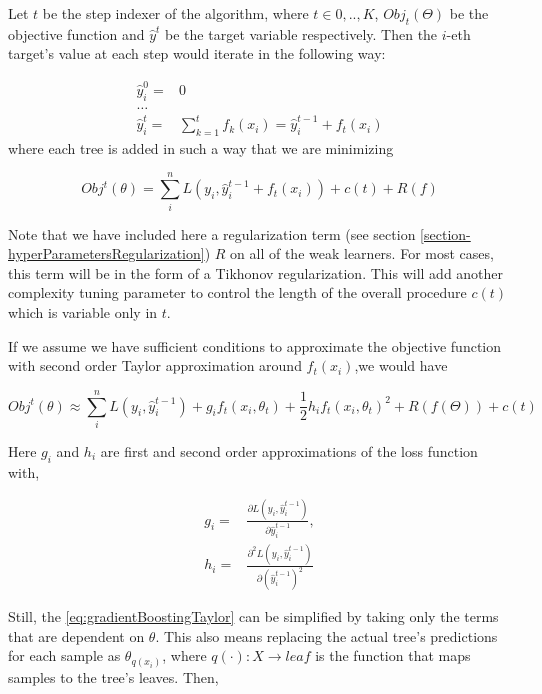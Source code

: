 \begin{appendices}
Let $t$ be the step indexer of the algorithm, where $t \in {0,..,K}$, $Obj_t(\Theta)$ be the objective function and $\hat{y}^t$ be the target variable respectively. 
Then the $i$-eth target's value at each step would iterate in the following way:

\begin{equation}\label{eq:gb-targetSteps}
\begin{split}
\hat{y}_i^0 = & 0 \\
\ldots \\
\hat{y}_i^t = &\sum_{k=1}^{t} f_k(x_i) = \hat{y}^{t-1}_i + f_t(x_i)
\end{split}
\end{equation}
where each tree is added in such a way that we are minimizing

\begin{equation}
Obj^t(\theta) = \sum_i^n L(y_i, \hat{y}^{t-1}_i + f_t(x_i) ) + c(t) + R(f)
\end{equation}


Note that we have included here a regularization term (see section \cref{section-hyperParametersRegularization}) $R$ on all of the weak learners. 
For most cases, this term will be in the form of a Tikhonov regularization. 
This will add another complexity tuning parameter to control the length of the overall procedure $c(t)$ which is variable only in $t$.

If we assume we have sufficient conditions to approximate the objective function with second order Taylor approximation around $f_t(x_i)$,we would have

\begin{equation}\label{eq:gradientBoostingTaylor}
Obj^t(\theta) \approx \sum_i^n {L(y_i, \hat{y}^{t-1}_i) + g_i f_t(x_i,\theta_t) + \frac{1}{2} h_i {f_t(x_i,\theta_t)}^2 } + R(f(\Theta)) + c(t)
\end{equation}

Here $g_i$ and $h_i$ are first and second order approximations of the loss function with,

\begin{equation}
\begin{split}
g_i = & \frac{\partial L(y_i, \hat{y}^{t-1}_i)}{\partial \hat{y}^{t-1}_i},  \\
h_i = & \frac{\partial^2 L(y_i, \hat{y}^{t-1}_i)}{\partial {(\hat{y}^{t-1}_i)}^2 }
\end{split}
\end{equation}

Still, the \cref{eq:gradientBoostingTaylor} can be simplified by taking only the terms that are dependent on $\theta$. 
This also means replacing the actual tree's predictions for each sample as $\theta_{q(x_i)}$, where $q(\cdot): X \rightarrow leaf$ is the function that maps samples to the tree's leaves. Then,


\end{appendices}
